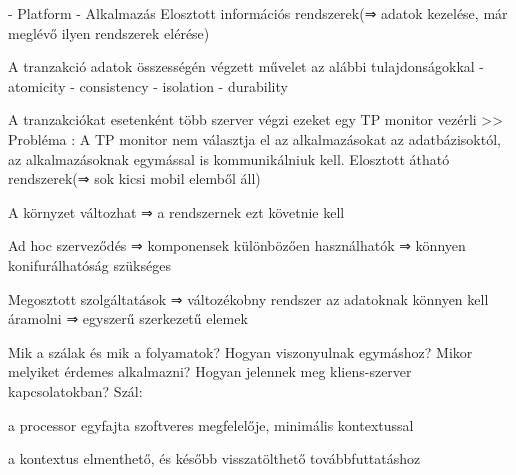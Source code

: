 \documentclass[twoside, a4paper, 12pt]{article}
\begin{document}
\begin{description}
                                                                        - Platform
                                                                        - Alkalmazás
                                                                        Elosztott információs rendszerek(⇒  adatok kezelése, már meglévő ilyen rendszerek elérése)
                                                                    \item A tranzakció adatok összességén végzett művelet az alábbi tulajdonságokkal
                                                                        - atomicity
                                                                        - consistency
                                                                        - isolation
                                                                        - durability
                                                                    \item A tranzakciókat esetenként több szerver végzi ezeket egy TP monitor vezérli 
                                                                        >> Probléma :  A TP monitor nem választja el az alkalmazásokat az adatbázisoktól,  az alkalmazásoknak egymással is kommunikálniuk kell.
                                                                        Elosztott átható rendszerek(⇒ sok kicsi mobil elemből áll)
                                                                    \item A környzet változhat ⇒ a rendszernek ezt követnie kell
                                                                    \item Ad hoc szerveződés ⇒ komponensek különbözően használhatók ⇒ könnyen konifurálhatóság szükséges
                                                                    \item Megosztott szolgáltatások ⇒ változékobny rendszer az adatoknak könnyen kell áramolni ⇒ egyszerű szerkezetű elemek
                                                                    \item  Mik a szálak és mik a folyamatok? Hogyan viszonyulnak egymáshoz? Mikor melyiket érdemes alkalmazni? Hogyan jelennek meg kliens-szerver kapcsolatokban?	
                                                                        Szál:
                                                                    \item a processor egyfajta szoftveres megfelelője, minimális kontextussal
                                                                    \item a kontextus elmenthető, és később visszatölthető továbbfuttatáshoz 

\end{description}
\end{document}
